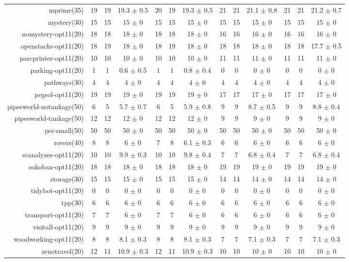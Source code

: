 \begin{center}
\begin{tabular}{|r|*{4}{ccc|}}
mprime(35) & 19 & 19 & 19.3 $\pm$ 0.5 & 20 & 19 & 19.3 $\pm$ 0.5 & 21 & 21 & 21.1 $\pm$ 0.8 & 21 & 21 & 21.2 $\pm$ 0.7\\
mystery(30) & 15 & 15 & 15 $\pm$ 0 & 15 & 15 & 15 $\pm$ 0 & 15 & 15 & 15 $\pm$ 0 & 15 & 15 & 15 $\pm$ 0\\
nomystery-opt11(20) & 18 & 18 & 18 $\pm$ 0 & 18 & 18 & 18 $\pm$ 0 & 16 & 16 & 16 $\pm$ 0 & 16 & 16 & 16 $\pm$ 0\\
openstacks-opt11(20) & 18 & 19 & 18 $\pm$ 0 & 18 & 19 & 18 $\pm$ 0 & 18 & 18 & 18 $\pm$ 0 & 18 & 18 & 17.7 $\pm$ 0.5\\
parcprinter-opt11(20) & 10 & 10 & 10 $\pm$ 0 & 10 & 10 & 10 $\pm$ 0 & 11 & 11 & 11 $\pm$ 0 & 11 & 11 & 11 $\pm$ 0\\
parking-opt11(20) & 1 & 1 & 0.6 $\pm$ 0.5 & 1 & 1 & 0.8 $\pm$ 0.4 & 0 & 0 & 0 $\pm$ 0 & 0 & 0 & 0 $\pm$ 0\\
pathways(30) & 4 & 4 & 4 $\pm$ 0 & 4 & 4 & 4 $\pm$ 0 & 4 & 4 & 4 $\pm$ 0 & 4 & 4 & 4 $\pm$ 0\\
pegsol-opt11(20) & 19 & 19 & 19 $\pm$ 0 & 19 & 19 & 19 $\pm$ 0 & 17 & 17 & 17 $\pm$ 0 & 17 & 17 & 17 $\pm$ 0\\
pipesworld-notankage(50) & 6 & 5 & 5.7 $\pm$ 0.7 & 6 & 5 & 5.9 $\pm$ 0.8 & 9 & 9 & 8.7 $\pm$ 0.5 & 9 & 9 & 8.8 $\pm$ 0.4\\
pipesworld-tankage(50) & 12 & 12 & 12 $\pm$ 0 & 12 & 12 & 12 $\pm$ 0 & 9 & 9 & 9 $\pm$ 0 & 9 & 9 & 9 $\pm$ 0\\
psr-small(50) & 50 & 50 & 50 $\pm$ 0 & 50 & 50 & 50 $\pm$ 0 & 50 & 50 & 50 $\pm$ 0 & 50 & 50 & 50 $\pm$ 0\\
rovers(40) & 8 & 8 & 6 $\pm$ 0 & 7 & 8 & 6.1 $\pm$ 0.3 & 6 & 6 & 6 $\pm$ 0 & 6 & 6 & 6 $\pm$ 0\\
scanalyzer-opt11(20) & 10 & 10 & 9.9 $\pm$ 0.3 & 10 & 10 & 9.8 $\pm$ 0.4 & 7 & 7 & 6.8 $\pm$ 0.4 & 7 & 7 & 6.8 $\pm$ 0.4\\
sokoban-opt11(20) & 18 & 18 & 18 $\pm$ 0 & 18 & 18 & 18 $\pm$ 0 & 19 & 19 & 19 $\pm$ 0 & 19 & 19 & 19 $\pm$ 0\\
storage(30) & 15 & 15 & 15 $\pm$ 0 & 15 & 15 & 15 $\pm$ 0 & 14 & 14 & 14 $\pm$ 0 & 14 & 14 & 14 $\pm$ 0\\
tidybot-opt11(20) & 0 & 0 & 0 $\pm$ 0 & 0 & 0 & 0 $\pm$ 0 & 0 & 0 & 0 $\pm$ 0 & 0 & 0 & 0 $\pm$ 0\\
tpp(30) & 6 & 6 & 6 $\pm$ 0 & 6 & 6 & 6 $\pm$ 0 & 6 & 6 & 6 $\pm$ 0 & 6 & 6 & 6 $\pm$ 0\\
transport-opt11(20) & 7 & 7 & 6 $\pm$ 0 & 7 & 7 & 6 $\pm$ 0 & 6 & 6 & 6 $\pm$ 0 & 6 & 6 & 6 $\pm$ 0\\
visitall-opt11(20) & 9 & 9 & 9 $\pm$ 0 & 9 & 9 & 9 $\pm$ 0 & 9 & 9 & 9 $\pm$ 0 & 9 & 9 & 9 $\pm$ 0\\
woodworking-opt11(20) & 8 & 8 & 8.1 $\pm$ 0.3 & 8 & 8 & 8.1 $\pm$ 0.3 & 7 & 7 & 7.1 $\pm$ 0.3 & 7 & 7 & 7.1 $\pm$ 0.3\\
zenotravel(20) & 12 & 11 & 10.9 $\pm$ 0.3 & 12 & 11 & 10.9 $\pm$ 0.3 & 10 & 10 & 10 $\pm$ 0 & 10 & 10 & 10 $\pm$ 0\\
\end{tabular}
\end{center}
